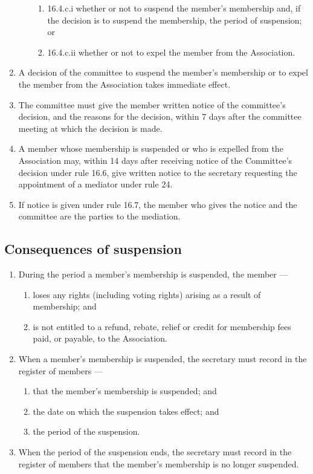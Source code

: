 \documentclass[../constitution.tex]{subfiles}
\begin{document}
\begin{enumerate}
\begin{enumerate}
\begin{enumerate}
    \item 16.4.c.i whether or not to suspend the member's membership and, if the decision is to suspend the membership, the period of suspension; or
    \item 16.4.c.ii whether or not to expel the member from the Association.
    \end{enumerate}
  \end{enumerate}
\item A decision of the committee to suspend the member's membership or to expel the member from the Association takes immediate effect.
\item The committee must give the member written notice of the committee's decision, and the reasons for the decision, within 7 days after the committee meeting at which the decision is made.
\item A member whose membership is suspended or who is expelled from the Association may, within 14 days after receiving notice of the Committee's decision under rule 16.6, give written notice to the secretary requesting the appointment of a mediator under rule 24.
\item If notice is given under rule 16.7, the member who gives the notice and the committee are the parties to the mediation.
\end{enumerate}

\hypertarget{consequences-of-suspension}{%
\subsection{Consequences of suspension}\label{consequences-of-suspension}}

\begin{enumerate}

\item During the period a member's membership is suspended, the member ---

  \begin{enumerate}
  
  \item loses any rights (including voting rights) arising as a result of membership; and
  \item is not entitled to a refund, rebate, relief or credit for membership fees paid, or payable, to the Association.
  \end{enumerate}
\item When a member's membership is suspended, the secretary must record in the register of members ---

  \begin{enumerate}
  
  \item that the member's membership is suspended; and
  \item the date on which the suspension takes effect; and
  \item the period of the suspension.
  \end{enumerate}
\item When the period of the suspension ends, the secretary must record in the register of members that the member's membership is no longer suspended.
\end{enumerate}
\end{document}

